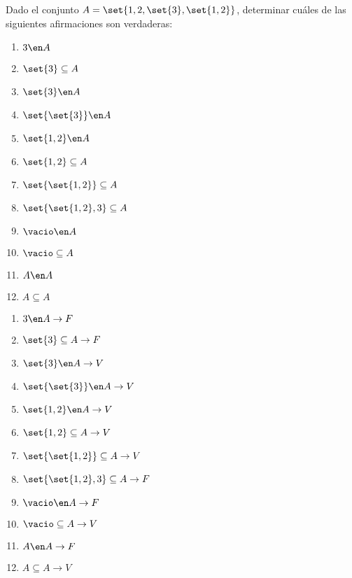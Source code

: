 \begin{enunciado}{\ejercicio}

  Dado el conjunto $A = \set{1,2,\set{3},\set{1,2}}$,
  determinar cuáles de las siguientes afirmaciones son verdaderas:\par

  \begin{multicols}{4}
    \begin{enumerate}[label=(\roman*)]
      \item $3 \en A         $
      \item $\set{3} \subseteq A $
      \item $\set{3} \en A    $
      \item $\set{\set{3}} \en A $
      \item $\set{1,2} \en A $
      \item $\set{1,2} \subseteq A  $
      \item $\set{\set{1,2}} \subseteq A  $
      \item $\set{\set{1,2}, 3} \subseteq A  $
      \item $\vacio \en A  $
      \item $\vacio \subseteq A  $
      \item $A \en A  $
      \item $A \subseteq A  $
    \end{enumerate}
  \end{multicols}

\end{enunciado}

\begin{multicols}{4}
        \begin{enumerate}[label=(\roman*)]
    \item $3 \en A       \to F  $
    \item $\set{3} \subseteq A \to F$
    \item $\set{3} \en A    \to V$
    \item $\set{\set{3}} \en A \to V$
    \item $\set{1,2} \en A \to V$
    \item $\set{1,2} \subseteq A \to V $
    \item $\set{\set{1,2}} \subseteq A \to V $
    \item ${\set{\set{1,2}, 3} \subseteq A \to F}$
    \item $\vacio \en A \to F $
    \item $\vacio \subseteq A \to V $
    \item $A \en A \to F $
    \item $A \subseteq A \to V $
  \end{enumerate}
\end{multicols}
